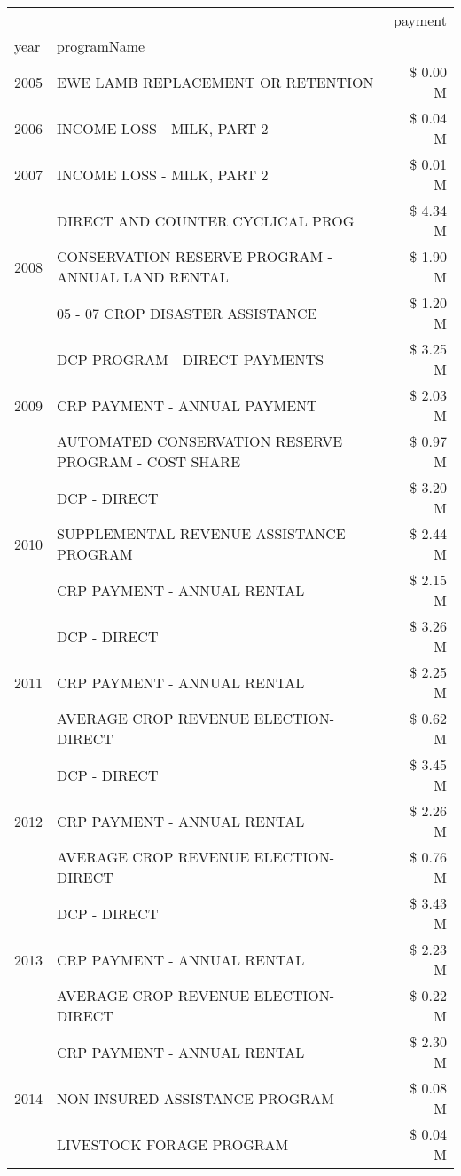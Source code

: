 \begin{tabular}{llr}
\toprule
 &  & payment \\
year & programName &  \\
\midrule
2005 & EWE LAMB REPLACEMENT OR RETENTION & \$ 0.00 M \\
\cline{1-3}
2006 & INCOME LOSS - MILK, PART 2 & \$ 0.04 M \\
\cline{1-3}
2007 & INCOME LOSS - MILK, PART 2 & \$ 0.01 M \\
\cline{1-3}
\multirow[t]{3}{*}{2008} & DIRECT AND COUNTER CYCLICAL PROG & \$ 4.34 M \\
 & CONSERVATION RESERVE PROGRAM - ANNUAL LAND RENTAL & \$ 1.90 M \\
 & 05 - 07 CROP DISASTER ASSISTANCE & \$ 1.20 M \\
\cline{1-3}
\multirow[t]{3}{*}{2009} & DCP PROGRAM - DIRECT PAYMENTS & \$ 3.25 M \\
 & CRP PAYMENT - ANNUAL PAYMENT & \$ 2.03 M \\
 & AUTOMATED CONSERVATION RESERVE PROGRAM - COST SHARE & \$ 0.97 M \\
\cline{1-3}
\multirow[t]{3}{*}{2010} & DCP - DIRECT & \$ 3.20 M \\
 & SUPPLEMENTAL REVENUE ASSISTANCE PROGRAM & \$ 2.44 M \\
 & CRP PAYMENT - ANNUAL RENTAL & \$ 2.15 M \\
\cline{1-3}
\multirow[t]{3}{*}{2011} & DCP - DIRECT & \$ 3.26 M \\
 & CRP PAYMENT - ANNUAL RENTAL & \$ 2.25 M \\
 & AVERAGE CROP REVENUE ELECTION-DIRECT & \$ 0.62 M \\
\cline{1-3}
\multirow[t]{3}{*}{2012} & DCP - DIRECT & \$ 3.45 M \\
 & CRP PAYMENT - ANNUAL RENTAL & \$ 2.26 M \\
 & AVERAGE CROP REVENUE ELECTION-DIRECT & \$ 0.76 M \\
\cline{1-3}
\multirow[t]{3}{*}{2013} & DCP - DIRECT & \$ 3.43 M \\
 & CRP PAYMENT - ANNUAL RENTAL & \$ 2.23 M \\
 & AVERAGE CROP REVENUE ELECTION-DIRECT & \$ 0.22 M \\
\cline{1-3}
\multirow[t]{3}{*}{2014} & CRP PAYMENT - ANNUAL RENTAL & \$ 2.30 M \\
 & NON-INSURED ASSISTANCE PROGRAM & \$ 0.08 M \\
 & LIVESTOCK FORAGE PROGRAM & \$ 0.04 M \\
\cline{1-3}

\end{tabular}
